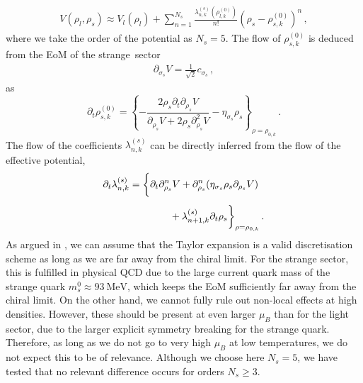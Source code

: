 \documentclass[10pt,prd,superscriptaddress,twocolumn]{revtex4-2}
\begin{document}
%
\begin{align}
	V(\rho_l, \rho_s) \approx V_l(\rho_l) + \sum_{n=1}^{N_s} \frac{\lambda^{(s)}_{n,k}(\rho^{(0)}_{l,k})}{n!} (\rho_s - \rho^{(0)}_{s,k})^n
	\,,
\end{align}
%
where we take the order of the potential as $N_s = 5$. The flow of $\rho_{s,k}^{(0)}$ is deduced from the {EoM} of the strange~sector
%
\begin{align}
	\partial_{\sigma_s} V = \frac{1}{\sqrt{2}}c_{\sigma_s}
	\,,
\end{align}
%
as
%
\begin{equation}
	\partial_t \rho_{s,k}^{(0)} = \left\{
	-\frac{2 \rho_s\partial_t\partial_{\rho_s}V }{\partial_{\rho_s}V+2 \rho_s \partial_{\rho_s}^2V} - \eta_{\sigma_s}\rho_s
	\right\}_{\rho = \rho_{0,k}}
	\,.
\end{equation}
%
The flow of the coefficients $\lambda^{(s)}_{n,k}$ can be directly inferred from the flow of the effective potential,
%
\begin{align}
	\partial_t \lambda^{(s)}_{n,k} = \bigg\{&
	\partial_t\partial_{\rho_s}^n V
	+ \partial_{\rho_s}^n (\eta_{\sigma_s} \rho_s \partial_{\rho_s}V )
	\notag\\[1ex]
	&\qquad+ \lambda^{(s)}_{n+1,k}\partial_t \rho_s
	\bigg\}_{\rho = \rho_{0,k}}
	\,.
\end{align}
%
As argued in \cite{Ihssen:2024miv}, we can assume that the Taylor expansion is a valid discretisation scheme as long as we are far away from the chiral limit. For the strange sector, this is fulfilled in physical {QCD} due to the large current quark mass of the strange quark $m_s^0\approx\qty{93}{\MeV}$, which keeps the {EoM} sufficiently far away from the chiral limit.
On the other hand, we cannot fully rule out non-local effects at high densities. However, these should be present at even larger $\mu_B$ than for the light sector, due to the larger explicit symmetry breaking for the strange quark. Therefore, as long as we do not go to very high $\mu_B$ at low temperatures, we do not expect this to be of relevance.
Although we choose here $N_s = 5$, we have tested that no relevant difference occurs for orders $N_s \geq 3$.
\end{document}

